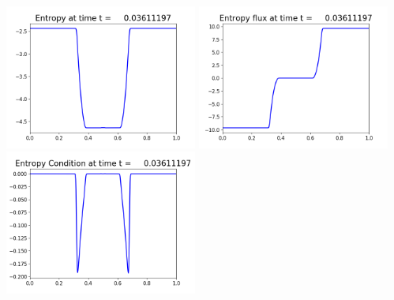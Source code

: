 \documentclass[11pt]{article}
\begin{document}
\vskip 10pt 
\includegraphics[width=0.475\textwidth]{frame0100fig1007.png}
\includegraphics[width=0.475\textwidth]{frame0100fig1008.png}
\vskip 10pt 
\includegraphics[width=0.475\textwidth]{frame0100fig1009.png}
\end{document}
